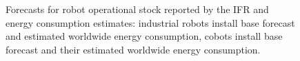 \begin{figure}[!t]
	\hfill    
	\hspace*{\fill}    
	\caption[] {\label{fig:robot_forecasts} Forecasts for robot operational stock reported by the IFR and energy consumption estimates:  industrial robots install base forecast and  estimated worldwide energy consumption,  cobots install base forecast and their  estimated worldwide energy consumption.}
\end{figure}

